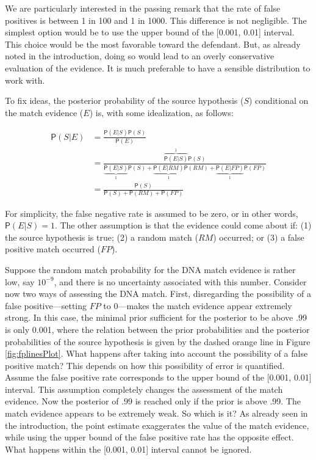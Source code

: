 \documentclass[
  10pt,
  dvipsnames,enabledeprecatedfontcommands]{scrartcl}
\newcommand{\pr}[1]{\mathsf{P}(#1)}
\begin{document}
\noindent We are particularly interested in the passing remark that the
rate of false positives is between 1 in 100 and 1 in 1000. This
difference is not negligible. The simplest option would be to use the
upper bound of the {[}0.001, 0.01{]} interval. This choice would be the
most favorable toward the defendant. But, as already noted in the
introduction, doing so would lead to an overly conservative evaluation
of the evidence. It is much preferable to have a sensible distribution
to work with.

To fix ideas, the posterior probability of the source hypothesis (\(S\))
conditional on the match evidence (\(E\)) is, with some idealization, as
follows:

\begin{align*}
\pr{S \vert E} &   =  \frac{\pr{E\vert S} \pr{S} } {\pr{E}}\\
& = \frac{\overbrace{\pr{E\vert S}}^1 \pr{S}}{\underbrace{\pr{E\vert S}}_1 \pr{S} + \underbrace{\pr{E \vert RM}}_1 \pr{RM} + \underbrace{\pr{E \vert FP}}_1 \pr{FP}} \\ & = \frac{\pr{S}}{\pr{S} + \pr{RM} + \pr{FP}} 
\end{align*}

\noindent For simplicity, the false negative rate is assumed to be zero,
or in other words, \(\pr{E\vert S} =1\). The other assumption is that
the evidence could come about if: (1) the source hypothesis is true; (2)
a random match (\(RM\)) occurred; or (3) a false positive match occurred
(\(FP\)).

Suppose the random match probability for the DNA match evidence is
rather low, say \(10^{-9}\), and there is no uncertainty associated with
this number. Consider now two ways of assessing the DNA match. First,
disregarding the possibility of a false positive---setting \(FP\) to
\(0\)---makes the match evidence appear extremely strong. In this case,
the minimal prior sufficient for the posterior to be above .99 is only
0.001, where the relation between the prior probabilities and the
posterior probabilities of the source hypothesis is given by the dashed
orange line in Figure \ref{fig:fplinesPlot}. What happens after taking
into account the possibility of a false positive match? This depends on
how this possibility of error is quantified. Assume the false positive
rate corresponds to the upper bound of the {[}0.001, 0.01{]} interval.
This assumption completely changes the assessment of the match evidence.
Now the posterior of \(.99\) is reached only if the prior is above .99.
The match evidence appears to be extremely weak. So which is it? As
already seen in the introduction, the point estimate exaggerates the
value of the match evidence, while using the upper bound of the false
positive rate has the opposite effect. What happens within the {[}0.001,
0.01{]} interval cannot be ignored.
\end{document}
